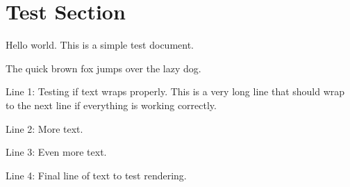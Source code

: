 \documentclass{article}
\begin{document}
\section{Test Section}
Hello world. This is a simple test document.

The quick brown fox jumps over the lazy dog.

Line 1: Testing if text wraps properly. This is a very long line that should wrap to the next line if everything is working correctly.

Line 2: More text.

Line 3: Even more text.

Line 4: Final line of text to test rendering.
\end{document}
